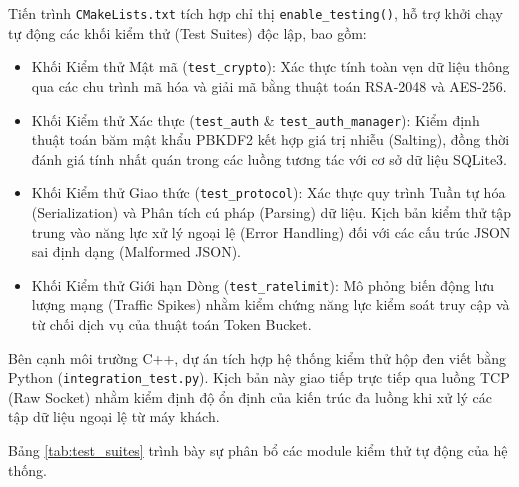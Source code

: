 Tiến trình \texttt{CMakeLists.txt} tích hợp chỉ thị \texttt{enable\_testing()}, hỗ trợ khởi chạy tự động các khối kiểm thử (Test Suites) độc lập, bao gồm:

\begin{itemize}[label={-}]
    \item Khối Kiểm thử Mật mã (\texttt{test\_crypto}): Xác thực tính toàn vẹn dữ liệu thông qua các chu trình mã hóa và giải mã bằng thuật toán RSA-2048 và AES-256.
    \item Khối Kiểm thử Xác thực (\texttt{test\_auth} \& \texttt{test\_auth\_manager}): Kiểm định thuật toán băm mật khẩu PBKDF2 kết hợp giá trị nhiễu (Salting), đồng thời đánh giá tính nhất quán trong các luồng tương tác với cơ sở dữ liệu SQLite3.
    \item Khối Kiểm thử Giao thức (\texttt{test\_protocol}): Xác thực quy trình Tuần tự hóa (Serialization) và Phân tích cú pháp (Parsing) dữ liệu. Kịch bản kiểm thử tập trung vào năng lực xử lý ngoại lệ (Error Handling) đối với các cấu trúc JSON sai định dạng (Malformed JSON).
    \item Khối Kiểm thử Giới hạn Dòng (\texttt{test\_ratelimit}): Mô phỏng biến động lưu lượng mạng (Traffic Spikes) nhằm kiểm chứng năng lực kiểm soát truy cập và từ chối dịch vụ của thuật toán Token Bucket.
\end{itemize}

Bên cạnh môi trường C++, dự án tích hợp hệ thống kiểm thử hộp đen viết bằng Python (\texttt{integration\_test.py}). Kịch bản này giao tiếp trực tiếp qua luồng TCP (Raw Socket) nhằm kiểm định độ ổn định của kiến trúc đa luồng khi xử lý các tập dữ liệu ngoại lệ từ máy khách.

Bảng \ref{tab:test_suites} trình bày sự phân bổ các module kiểm thử tự động của hệ thống.


